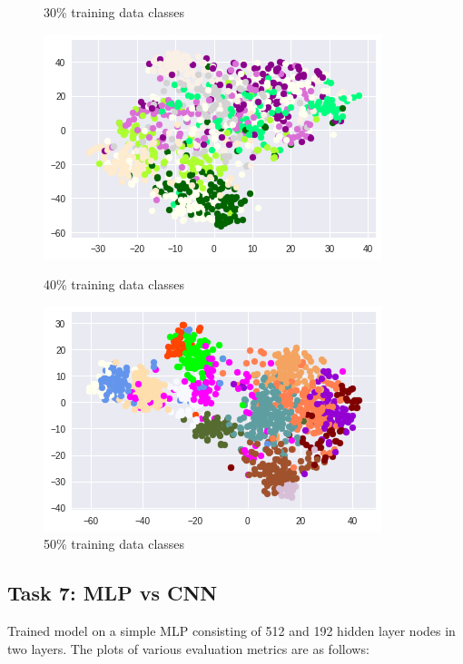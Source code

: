 \documentclass{article}
\begin{document}
\begin{figure}[!htb]
	\caption{30\% training data classes}\label{fig:part_2_task_5_class_30}
	\endminipage\hfill
	\includegraphics[width=\linewidth]{../output_plots/CIFAR/clustering/class-dstribution-40.png}
	\caption{40\% training data classes}\label{fig:part_2_task_5_class_40}
	\endminipage
	\includegraphics[width=\linewidth]{../output_plots/CIFAR/clustering/class-dstribution-50.png}
	\caption{50\% training data classes}\label{fig:part_2_task_5_class_50}
	\endminipage
\end{figure}

\pagebreak
\subsection{Task 7: MLP vs CNN}
Trained model on a simple MLP consisting of 512 and 192 hidden layer nodes in two layers. The plots of various evaluation metrics are as follows:
\end{document}
